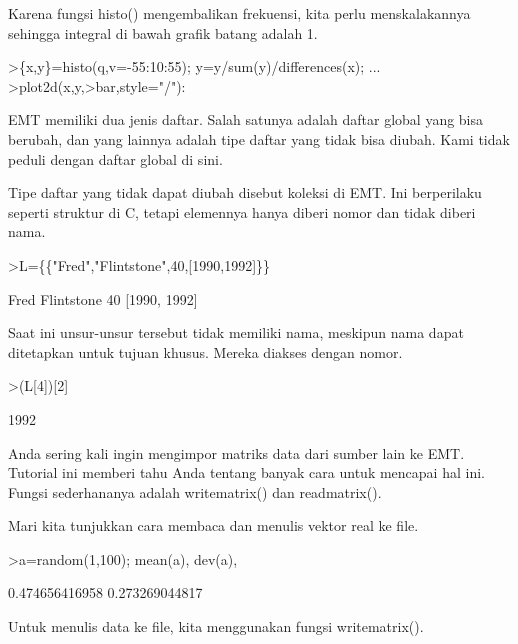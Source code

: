 \documentclass[a4paper,10pt]{article}
\begin{document}
\begin{eulernotebook}
\begin{eulercomment}
\begin{eulercomment}
\begin{eulercomment}
Karena fungsi histo() mengembalikan frekuensi, kita perlu
menskalakannya sehingga integral di bawah grafik batang adalah 1.
\end{eulercomment}
\begin{eulerprompt}
>\{x,y\}=histo(q,v=-55:10:55); y=y/sum(y)/differences(x); ...
>plot2d(x,y,>bar,style="/"):
\end{eulerprompt}
\begin{eulercomment}
EMT memiliki dua jenis daftar. Salah satunya adalah daftar global yang
bisa berubah, dan yang lainnya adalah tipe daftar yang tidak bisa
diubah. Kami tidak peduli dengan daftar global di sini.

Tipe daftar yang tidak dapat diubah disebut koleksi di EMT. Ini
berperilaku seperti struktur di C, tetapi elemennya hanya diberi nomor
dan tidak diberi nama.
\end{eulercomment}
\begin{eulerprompt}
>L=\{\{"Fred","Flintstone",40,[1990,1992]\}\}
\end{eulerprompt}
\begin{euleroutput}
  Fred
  Flintstone
  40
  [1990,  1992]
\end{euleroutput}
\begin{eulercomment}
Saat ini unsur-unsur tersebut tidak memiliki nama, meskipun nama dapat
ditetapkan untuk tujuan khusus. Mereka diakses dengan nomor.
\end{eulercomment}
\begin{eulerprompt}
>(L[4])[2]
\end{eulerprompt}
\begin{euleroutput}
  1992
\end{euleroutput}
\begin{eulercomment}
Anda sering kali ingin mengimpor matriks data dari sumber lain ke EMT.
Tutorial ini memberi tahu Anda tentang banyak cara untuk mencapai hal
ini. Fungsi sederhananya adalah writematrix() dan readmatrix().

Mari kita tunjukkan cara membaca dan menulis vektor real ke file.
\end{eulercomment}
\begin{eulerprompt}
>a=random(1,100); mean(a), dev(a),
\end{eulerprompt}
\begin{euleroutput}
  0.474656416958
  0.273269044817
\end{euleroutput}
\begin{eulercomment}
Untuk menulis data ke file, kita menggunakan fungsi writematrix().


\end{eulercomment}
\end{eulercomment}
\end{eulercomment}
\end{eulernotebook}
\end{document}
